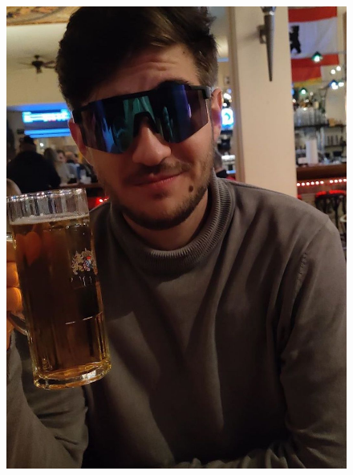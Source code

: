 \documentclass[10pt, a4paper,onecolumn ,titlepage]{article}
\begin{document}
\begin{titlepage}
\begin{center}
\begin{figure}[H]
\begin{minipage}[b]{.13\linewidth}
                    \includegraphics[width=\linewidth]{author_pictures/lennart}
                \end{minipage}\label{fig:lennart}
                \hspace{.005\linewidth}%
                \begin{minipage}[b]{.13\linewidth} %

\end{minipage}
\end{figure}
\end{center}
\end{titlepage}
\end{document}
